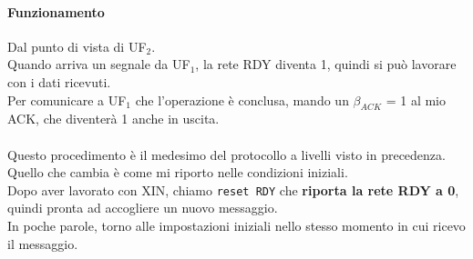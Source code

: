 \documentclass[10pt]{report}
\begin{document}
\paragraph{Funzionamento} Dal punto di vista di UF$_2$.\\
Quando arriva un segnale da UF$_1$, la rete RDY diventa 1, quindi si può lavorare con i dati ricevuti.\\
Per comunicare a UF$_1$ che l'operazione è conclusa, mando un $\beta_{ACK}$ = 1 al mio ACK, che diventerà 1 anche in uscita.\\\\
Questo procedimento è il medesimo del protocollo a livelli visto in precedenza. Quello che cambia è come mi riporto nelle condizioni iniziali.\\
Dopo aver lavorato con XIN, chiamo \texttt{reset RDY} che \textbf{riporta la rete RDY a 0}, quindi pronta ad accogliere un nuovo messaggio.\\
In poche parole, torno alle impostazioni iniziali nello stesso momento in cui ricevo il messaggio.
\pagebreak
\end{document}
